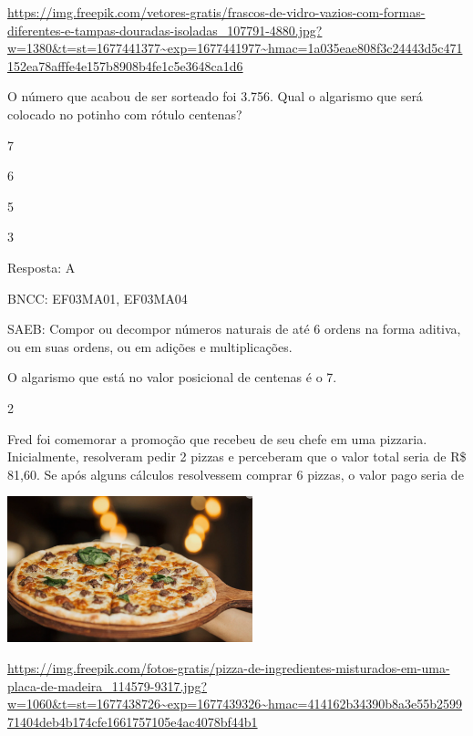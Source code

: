 \begin{escolha}
{\begin{escolha}
{%




\url{https://img.freepik.com/vetores-gratis/frascos-de-vidro-vazios-com-formas-diferentes-e-tampas-douradas-isoladas_107791-4880.jpg?w=1380\&t=st=1677441377~exp=1677441977~hmac=1a035eae808f3c24443d5c471152ea78afffe4e157b8908b4fe1c5e3648ca1d6}

O número que acabou de ser sorteado foi 3.756. Qual o algarismo que será colocado no potinho com rótulo centenas?

\begin{escolha}

\item
  7
\item
  6
\item
  5
\item
  3
\end{escolha}

Resposta: A

BNCC: EF03MA01, EF03MA04

SAEB: Compor ou decompor números naturais de até 6 ordens na
forma aditiva, ou em suas ordens, ou em adições e multiplicações.

O algarismo que está no valor posicional de centenas é o 7.

\num{2}

Fred foi comemorar a promoção que recebeu de seu chefe em uma pizzaria.
Inicialmente, resolveram pedir 2 pizzas e perceberam que o valor total
seria de R\$ 81,60. Se após alguns cálculos resolvessem comprar 6
pizzas, o valor pago seria de

\includegraphics[width=2.80000in,height=1.66867in]{media/image131.png}

\url{https://img.freepik.com/fotos-gratis/pizza-de-ingredientes-misturados-em-uma-placa-de-madeira_114579-9317.jpg?w=1060\&t=st=1677438726~exp=1677439326~hmac=414162b34390b8a3e55b259971404deb4b174cfe1661757105e4ac4078bf44b1}

}
\end{escolha}}
\end{escolha}
